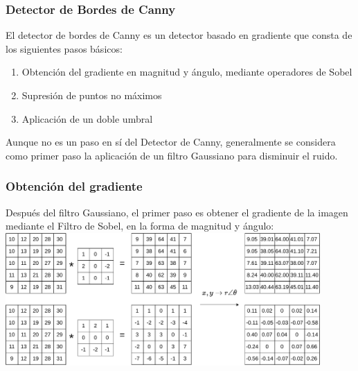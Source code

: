 \begin{frame}\frametitle{Detector de Bordes de Canny}
  El detector de bordes de Canny es un detector basado en gradiente que consta de los siguientes pasos básicos:
  \begin{enumerate}
  \item Obtención del gradiente en magnitud y ángulo, mediante operadores de Sobel
  \item Supresión de puntos no máximos
  \item Aplicación de un doble umbral
  \end{enumerate}
  Aunque no es un paso en sí del Detector de Canny, generalmente se considera como primer paso la aplicación de un filtro Gaussiano para disminuir el ruido. 
\end{frame}

\begin{frame}\frametitle{Obtención del gradiente}
  Después del filtro Gaussiano, el primer paso es obtener el gradiente de la imagen mediante el Filtro de Sobel, en la forma de magnitud y ángulo:\\
  \includegraphics[width=0.9\textwidth]{Figures/SobelXY.pdf}
\end{frame}

